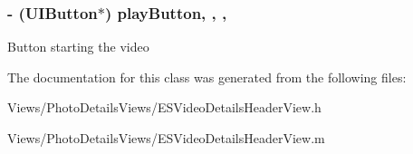 \subsubsection[{play\+Button}]{\setlength{\rightskip}{0pt plus 5cm}-\/ (U\+I\+Button$\ast$) play\+Button\hspace{0.3cm}{\ttfamily [read]}, {\ttfamily [write]}, {\ttfamily [nonatomic]}, {\ttfamily [strong]}}\label{interface_e_s_video_details_header_view_a36d08b79157feb31717e1826aa6f9a70}
Button starting the video 

The documentation for this class was generated from the following files\+:\begin{DoxyCompactItemize}
\item 
Views/\+Photo\+Details\+Views/E\+S\+Video\+Details\+Header\+View.\+h\item 
Views/\+Photo\+Details\+Views/E\+S\+Video\+Details\+Header\+View.\+m\end{DoxyCompactItemize}
